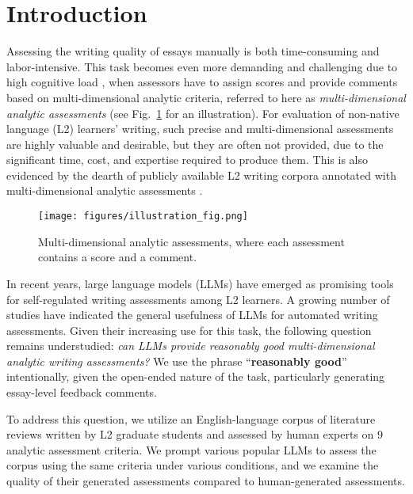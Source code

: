 \section{Introduction\label{sec:introduction}}

Assessing the writing quality of essays manually is both time-consuming and labor-intensive. This task becomes even more demanding and challenging due to high cognitive load \citep{Cai2015}, when assessors have to assign scores and provide comments based on multi-dimensional analytic criteria, referred to here as \textit{multi-dimensional analytic assessments} (see Fig.~\ref{fig:illustraion} for an illustration). For evaluation of non-native language (L2) learners' writing, such precise and multi-dimensional assessments are highly valuable and desirable, but they are often not provided, due to the significant time, cost, and expertise required to produce them. This is also evidenced by the dearth of publicly available L2 writing corpora annotated with multi-dimensional analytic assessments \citep{banno-etal-2024-gpt}.


\begin{figure}[]
    \centering
    \small
    \texttt{[image: figures/illustration\_fig.png]}
    \caption{Multi-dimensional analytic assessments, where each assessment contains a score and a comment.}
    \label{fig:illustraion}
\end{figure}


In recent years, large language models (LLMs) have emerged as promising tools for self-regulated writing assessments among L2 learners. A growing number of studies \citep[][\textit{i.a.}]{chiang-lee-2023-large, MIZUMOTO2023100050, han-etal-2024-llm, yancey-etal-2023-rating} have indicated the general usefulness of LLMs for automated writing assessments. Given their increasing use for this task, the following question remains understudied: \textit{can LLMs provide reasonably good multi-dimensional analytic writing assessments?} We use the phrase ``\textbf{reasonably good}'' intentionally, given the open-ended nature of the task, particularly generating essay-level feedback comments.



To address this question, we utilize an English-language corpus of literature reviews written by L2 graduate students and assessed by human experts on 9 analytic assessment criteria. We prompt various popular LLMs to assess the corpus using the same criteria under various conditions, and we examine the quality of their generated assessments compared to human-generated assessments.

